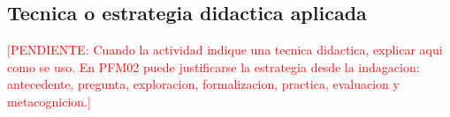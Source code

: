 \documentclass[
	spanish,
	letterpaper, oneside
]{article}
\newcommand{\pendiente}[1]{\textcolor{red}{[PENDIENTE: #1]}}
\begin{document}
\subsection{Tecnica o estrategia didactica aplicada}

\pendiente{Cuando la actividad indique una tecnica didactica, explicar aqui como se uso. En PFM02 puede justificarse la estrategia desde la indagacion: antecedente, pregunta, exploracion, formalizacion, practica, evaluacion y metacognicion.}

%
\end{document}
